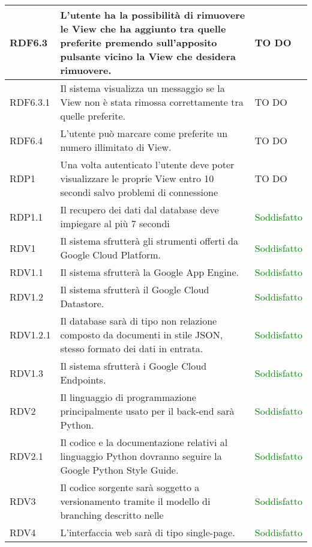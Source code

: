 \begin{center}
\begin{longtable}{| p{2.5cm} | p{8cm} | p{3.5cm} |}
		\hline
		RDF6.3  & L'utente ha la possibilità di rimuovere le View che ha aggiunto tra quelle preferite premendo sull'apposito pulsante vicino la View che desidera rimuovere.  &  TO DO \\
		\hline
		RDF6.3.1  & Il sistema visualizza un messaggio se la View non è stata rimossa correttamente tra quelle preferite.  &  TO DO \\
		\hline
		RDF6.4 & L'utente può marcare come preferite un numero illimitato di View. &  TO DO \\
		\hline
		RDP1  &  Una volta autenticato l'utente deve poter visualizzare le proprie View entro 10 secondi salvo problemi di connessione &  TO DO \\
		\hline
		RDP1.1  &  Il recupero dei dati dal database deve impiegare al più 7 secondi  &  \textcolor{green}{Soddisfatto} \\
		\hline
		RDV1  &  Il sistema sfrutterà gli strumenti offerti da Google Cloud Platform.  &  \textcolor{green}{Soddisfatto} \\
		\hline
		RDV1.1  &  Il sistema sfrutterà la Google App Engine.  &  \textcolor{green}{Soddisfatto} \\
		\hline
		RDV1.2  &  Il sistema sfrutterà il Google Cloud Datastore.  &  \textcolor{green}{Soddisfatto} \\
		\hline
		RDV1.2.1  &  Il database sarà di tipo non relazione composto da documenti in stile JSON, stesso formato dei dati in entrata.  &  \textcolor{green}{Soddisfatto} \\
		\hline
		RDV1.3  &  Il sistema sfrutterà i Google Cloud Endpoints.  &  \textcolor{green}{Soddisfatto} \\
		\hline
		RDV2  &  Il linguaggio di programmazione principalmente usato per il back-end sarà Python.  &  \textcolor{green}{Soddisfatto} \\
		\hline
		RDV2.1 & Il codice e la documentazione relativi al linguaggio Python dovranno seguire la Google Python Style Guide. & \textcolor{green}{Soddisfatto} \\
		\hline
		RDV3  &  Il codice sorgente sarà soggetto a versionamento tramite il modello di branching descritto nelle \docNameVersionNdP  &  \textcolor{green}{Soddisfatto} \\
		\hline
		RDV4  &  L'interfaccia web sarà di tipo single-page.  &  \textcolor{green}{Soddisfatto} \\
		\hline
		
	\end{longtable}
	\egroup
\end{center}

